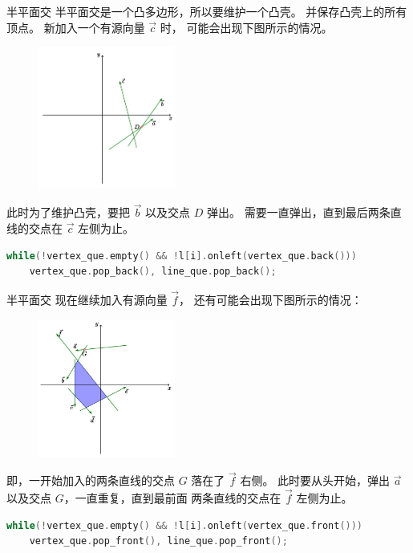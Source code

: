 \documentclass{beamer}
\begin{document}
\begin{frame}[fragile]{半平面交}
    \footnotesize
    半平面交是一个凸多边形，所以要维护一个凸壳。
    并保存凸壳上的所有顶点。
    新加入一个有源向量 $\overrightarrow{c}$ 时，
    可能会出现下图所示的情况。

    \begin{figure}[H]
        \centering
        \includegraphics[width=0.4\textwidth]{pic/halfplane_1.png}
    \end{figure}

    此时为了维护凸壳，要把 $\overrightarrow{b}$ 以及交点 $D$ 弹出。
    需要一直弹出，直到最后两条直线的交点在 $\overrightarrow{c}$ 左侧为止。

    \pause
    \begin{lstlisting}[language=c++]
while(!vertex_que.empty() && !l[i].onleft(vertex_que.back()))
    vertex_que.pop_back(), line_que.pop_back();
    \end{lstlisting}
\end{frame}

\begin{frame}[fragile]{半平面交}
    \footnotesize
    现在继续加入有源向量 $\overrightarrow{f}$，
    还有可能会出现下图所示的情况：

    \begin{figure}[H]
        \centering
        \includegraphics[width=0.4\textwidth]{pic/halfplane_2.png}
    \end{figure}

    即，一开始加入的两条直线的交点 $G$ 落在了 $\overrightarrow{f}$ 右侧。
    此时要从头开始，弹出 $\overrightarrow{a}$ 以及交点 $G$，一直重复，直到最前面
    两条直线的交点在 $\overrightarrow{f}$ 左侧为止。
    
    \pause
    \begin{lstlisting}[language=c++]
while(!vertex_que.empty() && !l[i].onleft(vertex_que.front()))
    vertex_que.pop_front(), line_que.pop_front();
    \end{lstlisting}
\end{frame}
\end{document}
